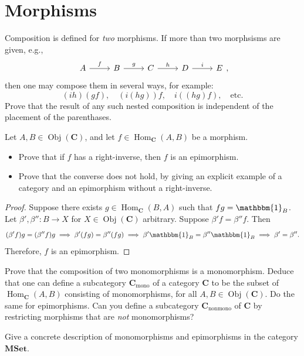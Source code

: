 \documentclass[11pt]{report}
\DeclareMathOperator{\Hom}{Hom}
\DeclareMathOperator{\Obj}{Obj}
\begin{document}
\section{Morphisms}
\begin{exercise}
	Composition is defined for \emph{two} morphisms. If more than two morphsisms are given, e.g.,
	\[\begin{tikzcd}[row sep=1em, column sep=2.5em]
		A\arrow[r,"f"]&B\arrow[r,"g"]&C\arrow[r,"h"]&D\arrow[r,"i"]&E
	\end{tikzcd},\]
	then one may compose them in several ways, for example:
	\[
		(ih)(gf),\quad (i(hg))f,\quad i((hg)f),\quad \text{etc.}
	\]
	Prove that the result of any such nested composition is independent of the placement of the parenthases.
\end{exercise}
\begin{exercise}
	Let $A,B\in \Obj( \mathbf{C} ) $, and let $f\in \Hom_{ \mathbf{C} }(A , B) $ be a morphism.
	\begin{itemize}
		\item Prove that if $f$ has a right-inverse, then $f$ is an epimorphism.
		\item Prove that the converse does not hold, by giving an explicit example of a category and an epimorphism without a right-inverse.
	\end{itemize}
\end{exercise}
\begin{proof}
	Suppose there exists $g\in \Hom_{ \mathbf{C} }(B , A) $ such that $fg=\mathbbm{1}_{B} $. Let $\beta ',\beta '': B \to X$ for $X\in \Obj( \mathbf{C} ) $ arbitrary. Suppose $\beta 'f=\beta ''f$. Then
	\[
		(\beta 'f)g=(\beta ''f)g\implies \beta '(fg)=\beta ''(fg)\implies \beta '\mathbbm{1}_{B} =\beta ''\mathbbm{1}_{B} \implies \beta '=\beta ''
	.\]
	Therefore, $f$ is an epimorphism.
\end{proof}
\begin{exercise}
	Prove that the composition of two monomorphisms is a monomorphism. Deduce that one can define a subcategory $\mathbf{C}_{\text{mono}}$ of a category $\mathbf{C}$ to be the subset of $\Hom_{ \mathbf{C} }(A , B) $ consisting of monomorphisms, for all $A,B\in \Obj( \mathbf{C} ) $. Do the same for epimorphisms. Can you define a subcategory $\mathbf{C}_{\text{nonmono}}$ of $\mathbf{C}$ by restricting morphisms that are \emph{not} monomorphisms?
\end{exercise}
\begin{exercise}
	Give a concrete description of monomorphisms and epimorphisms in the category $\mathbf{MSet}$.
\end{exercise}
\end{document}

